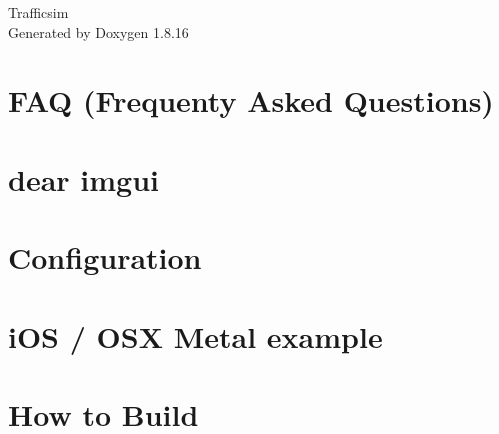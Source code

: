 \let\mypdfximage\pdfximage\def\pdfximage{\immediate\mypdfximage}\documentclass[twoside]{book}
\newcommand{\+}{\discretionary{\mbox{\scriptsize$\hookleftarrow$}}{}{}}
\newcommand{\clearemptydoublepage}{%
  \newpage{\pagestyle{empty}\cleardoublepage}%
}
\begin{document}
\hypersetup{pageanchor=false,
             bookmarksnumbered=true,
             pdfencoding=unicode
            }
\begin{titlepage}
\vspace*{7cm}
\begin{center}%
{\Large Trafficsim }\\
\vspace*{1cm}
{\large Generated by Doxygen 1.8.16}\\
\end{center}
\end{titlepage}
\clearemptydoublepage
{}
\tableofcontents
\clearemptydoublepage
{}
\hypersetup{pageanchor=true}

\chapter{F\+AQ (Frequenty Asked Questions)}
\label{md_deps_imgui_docs__f_a_q}

\chapter{dear imgui}
\label{md_deps_imgui_docs__r_e_a_d_m_e}

\chapter{Configuration}
\label{md_deps_imgui_examples_example_allegro5__r_e_a_d_m_e}

\chapter{i\+OS / O\+SX Metal example}
\label{md_deps_imgui_examples_example_apple_metal__r_e_a_d_m_e}

\chapter{How to Build}
\label{md_deps_imgui_examples_example_emscripten__r_e_a_d_m_e}

\end{document}
